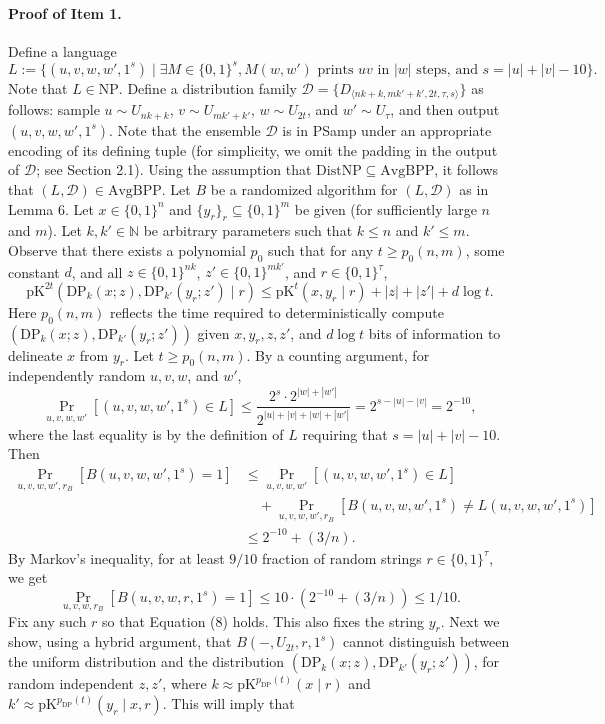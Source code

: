 \paragraph{Proof of Item 1.} Define a language
\[L:=\{(u,v,w,w',1^s)\mid\exists M\in\{0,1\}^s,M(w,w')\text{ prints }uv\text{ in }|w|\text{ steps, and }s=|u|+|v|-10\}.\]
Note that $L\in\mathrm{NP}$. Define a distribution family $\mathcal D=\{D_{\langle nk+k,mk'+k',2t,\tau,s\rangle}\}$ as follows: sample $u\sim U_{nk+k}$, $v\sim U_{mk'+k'}$, $w\sim U_{2t}$, and $w'\sim U_\tau$, and then output $(u,v,w,w',1^s)$. Note that the ensemble $\mathcal D$ is in PSamp under an appropriate encoding of its defining tuple (for simplicity, we omit the padding in the output of $\mathcal D$; see Section 2.1). Using the assumption that $\mathrm{DistNP}\subseteq\mathrm{AvgBPP}$, it follows that $(L,\mathcal D)\in\mathrm{AvgBPP}$. Let $B$ be a randomized algorithm for $(L,\mathcal D)$ as in Lemma 6.
Let $x\in\{0,1\}^n$ and $\{y_r\}_{r}\subseteq\{0,1\}^m$ be given (for sufficiently large $n$ and $m$). Let $k,k'\in\mathbb N$ be arbitrary parameters such that $k\leq n$ and $k'\leq m$. Observe that there exists a polynomial $p_0$ such that for any $t\geq p_0(n,m)$, some constant $d$, and all $z\in\{0,1\}^{nk}$, $z'\in\{0,1\}^{mk'}$, and $r\in\{0,1\}^\tau$,
\[\mathrm{pK}^{2t}(\mathrm{DP}_k(x;z),\mathrm{DP}_{k'}(y_r;z')\mid r)\leq\mathrm{pK}^t(x,y_r\mid r)+|z|+|z'|+d\log t.\tag{6}\]
Here $p_0(n,m)$ reflects the time required to deterministically compute $(\mathrm{DP}_k(x;z),\mathrm{DP}_{k'}(y_r;z'))$ given $x,y_r,z,z'$, and $d\log t$ bits of information to delineate $x$ from $y_r$.
Let $t\geq p_0(n,m)$. By a counting argument, for independently random $u,v,w$, and $w'$,
\[\Pr_{u,v,w,w'}[(u,v,w,w',1^s)\in L]\leq\frac{2^s\cdot2^{|w|+|w'|}}{2^{|u|+|v|+|w|+|w'|}}=2^{s-|u|-|v|}=2^{-10},\]
where the last equality is by the definition of $L$ requiring that $s=|u|+|v|-10$. Then
\begin{align*}
\Pr_{u,v,w,w',r_B}[B(u,v,w,w',1^s)=1]
&\leq\Pr_{u,v,w,w'}[(u,v,w,w',1^s)\in L]\\
&\quad+\Pr_{u,v,w,w',r_B}[B(u,v,w,w',1^s)\neq L(u,v,w,w',1^s)]\\
&\leq2^{-10}+(3/n).\tag{7}
\end{align*}
By Markov's inequality, for at least $9/10$ fraction of random strings $r\in\{0,1\}^\tau$, we get
\[\Pr_{u,v,w,r_B}[B(u,v,w,r,1^s)=1]\leq10\cdot(2^{-10}+(3/n))\leq1/10.\tag{8}\]
Fix any such $r$ so that Equation (8) holds. This also fixes the string $y_r$.
Next we show, using a hybrid argument, that $B(-,U_{2t},r,1^s)$ cannot distinguish between the uniform distribution and the distribution $(\mathrm{DP}_k(x;z),\mathrm{DP}_{k'}(y_r;z'))$, for random independent $z,z'$, where $k\approx\mathrm{pK}^{p_{\mathrm{DP}}(t)}(x\mid r)$ and $k'\approx\mathrm{pK}^{p_{\mathrm{DP}}(t)}(y_r\mid x,r)$. This will imply that
